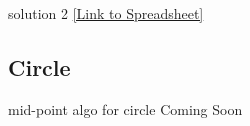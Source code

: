 \documentclass[aspectratio=169,xcolor={dvipsnames,svgnames}]{beamer}
\begin{document}
\begin{frame}[label={sec:org9a85322}]{solution 2}
\centering
\href{https://docs.google.com/spreadsheets/d/13s1unOAzBQmYA4SF9ifBtw02AEAUlfRTaOvl4m2cbEc/edit?usp=sharing}{[Link to Spreadsheet]​}
\end{frame}
\subsection{Circle}
\label{sec:orgb229fb1}


\begin{frame}[label={sec:org2cb37ae}]{mid-point algo for circle}
\centering
Coming Soon
\end{frame}
\end{document}
